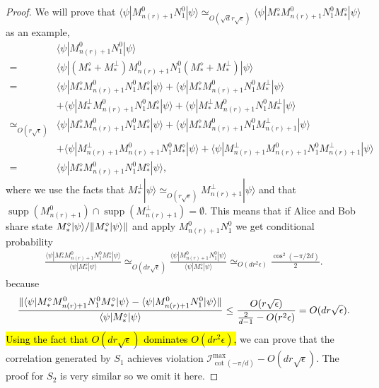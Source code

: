 \documentclass[11pt,letterpaper]{article}
\newcommand{\ket}[1]{|#1\rangle}
\newcommand{\bra}[1]{\langle#1|}
\DeclarePairedDelimiter{\norm}{\lVert}{\rVert}
\DeclareMathOperator{\supp}{supp}
\newcommand{\1}{\mathbb{1}}
\newcommand{\nr}{n(r)}
\newcommand{\I}{\mathcal{I}}
\newcommand{\ep}{\epsilon}
\newcommand{\se}{\sqrt{\epsilon}}
\newcommand{\sd}{\sqrt{d}}
\newcommand{\appd}[1]{\simeq_{#1}}
\theoremstyle{definition}
\begin{document}
\begin{proof}
We will prove that $\bra{\psi} M_{\nr+1}^0N_1^0 \ket{\psi} \appd{O(\sd r\se)} \bra{\psi}M_\ast^\diamond M_{\nr+1}^0N_1^0 M_\ast^\diamond\ket{\psi}$ as an example,
\begin{align*}
	   &\bra{\psi} M_{\nr+1}^0N_1^0 \ket{\psi} \\
	= &\bra{\psi}(M_\ast^\diamond + M_\ast^\perp) M_{\nr+1}^0N_1^0 (M_\ast^\diamond + M_\ast^\perp)\ket{\psi} \\
	= & \bra{\psi}M_\ast^\diamond M_{\nr+1}^0N_1^0 M_\ast^\diamond\ket{\psi} + \bra{\psi}M_\ast^\diamond M_{\nr+1}^0N_1^0 M_\ast^\perp\ket{\psi}\\
	&+\bra{\psi}M_\ast^\perp M_{\nr+1}^0N_1^0 M_\ast^\diamond\ket{\psi} + \bra{\psi}M_\ast^\perp M_{\nr+1}^0N_1^0 M_\ast^\perp\ket{\psi}\\
	\appd{O(r\se)} & \bra{\psi}M_\ast^\diamond M_{\nr+1}^0N_1^0 M_\ast^\diamond\ket{\psi} + \bra{\psi}M_\ast^\diamond M_{\nr+1}^0N_1^0 M_{\nr+1}^\perp\ket{\psi} \\
	&+\bra{\psi}M_{\nr+1}^\perp M_{\nr+1}^0N_1^0 M_\ast^\diamond\ket{\psi} + \bra{\psi}M_{\nr+1}^\perp M_{\nr+1}^0N_1^0 M_{\nr+1}^\perp\ket{\psi}\\
	=&\bra{\psi}M_\ast^\diamond M_{\nr+1}^0N_1^0 M_\ast^\diamond\ket{\psi},
\end{align*}
where we use the facts that $M_\ast^\perp \ket{\psi} \appd{O(r\se)} M_{\nr+1}^\perp \ket{\psi}$ and that 
$\supp(M_{\nr+1}^0) \cap \supp(M_{\nr+1}^\perp) = \emptyset$. This means that if Alice and Bob share state $M_\ast^\diamond \ket{\psi}/\norm{M_\ast^\diamond \ket{\psi}}$ and apply $M_{\nr+1}^0N_1^0$
we get conditional probability
\begin{align}
	\frac{\bra{\psi}M_\ast^\diamond M_{\nr+1}^0N_1^0 M_\ast^\diamond\ket{\psi}}{\bra{\psi} M_\ast^\diamond \ket{\psi}}  
	\appd{O(d r\se)} \frac{\bra{\psi} M_{\nr+1}^0N_1^0 \ket{\psi}}{\bra{\psi} M_\ast^\diamond \ket{\psi}}
	\appd{O(d r^2 \ep)}
	\frac{\cos^2(-\pi/2d)}{2}.
\end{align} 
because
\begin{align}
	\frac{ \norm{\bra{\psi}M_\ast^\diamond M_{\nr+1}^0N_1^0 M_\ast^\diamond\ket{\psi} -  \bra{\psi} M_{\nr+1}^0N_1^0 \ket{\psi}}}
	{\bra{\psi} M_\ast^\diamond \ket{\psi}} \leq \frac{O(r\se)}{\frac{2}{d-1} - O(r^2 \ep)} = O(d r  \se).
\end{align}
\hl{Using the fact that $O(d r \se)$ dominates $O(dr^2 \ep)$,}
we can prove that the correlation generated by $S_1$ achieves violation $\I^{\max}_{\cot(-\pi/d)} - O(d r \se)$.
The proof for $S_2$ is very similar so we omit it here.
\end{proof}
\end{document}
